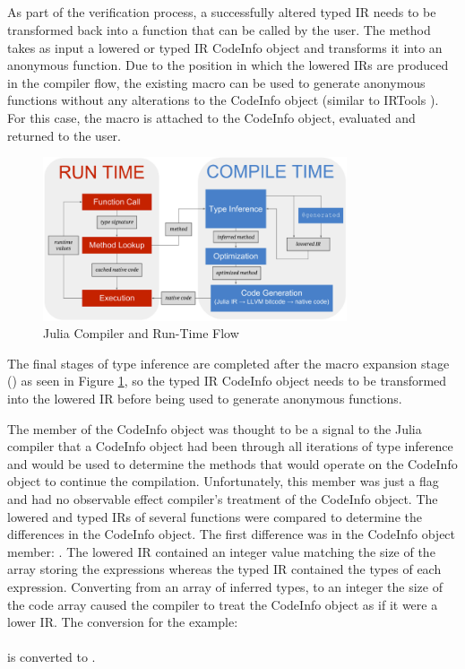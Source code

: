 \subsection{}
As part of the verification process, a successfully altered typed IR needs to be transformed back into a function that can be called by the user. The  method takes as input a lowered or typed IR CodeInfo object and transforms it into an anonymous function. Due to the position in which the lowered IRs are produced in the compiler flow, the existing  macro can be used to generate anonymous functions without any alterations to the CodeInfo object (similar to IRTools \cite{julia_irtools}). For this case, the macro is attached to the CodeInfo object, evaluated and returned to the user.

\begin{figure}[htb!]
    \centering
    \includegraphics[width=0.8\textwidth]{Images/v2julia_compiler.png}
    \caption{Julia Compiler and Run-Time Flow \cite{julia_compiler_dia}}
    \label{fig:julia_compiler_flow}
\end{figure}

The final stages of type inference are completed after the macro expansion stage () as seen in Figure \ref{fig:julia_compiler_flow}, so the typed IR CodeInfo object needs to be transformed into the lowered IR before being used to generate anonymous functions.
 
\pagebreak

The  member of the CodeInfo object was thought to be a signal to the Julia compiler that a CodeInfo object had been through all iterations of type inference and would be used to determine the methods that would operate on the CodeInfo object to continue the compilation. Unfortunately, this member was just a flag and had no observable effect compiler's treatment of the CodeInfo object. The lowered and typed IRs of several functions were compared to determine the differences in the CodeInfo object. The first difference was in the CodeInfo object member: . The lowered IR contained an integer value matching the size of the array storing the expressions whereas the typed IR contained the types of each expression. Converting from an array of inferred types, to an integer the size of the code array caused the compiler to treat the CodeInfo object as if it were a lower IR. The conversion for the  example:\\ \\ is converted to . 

